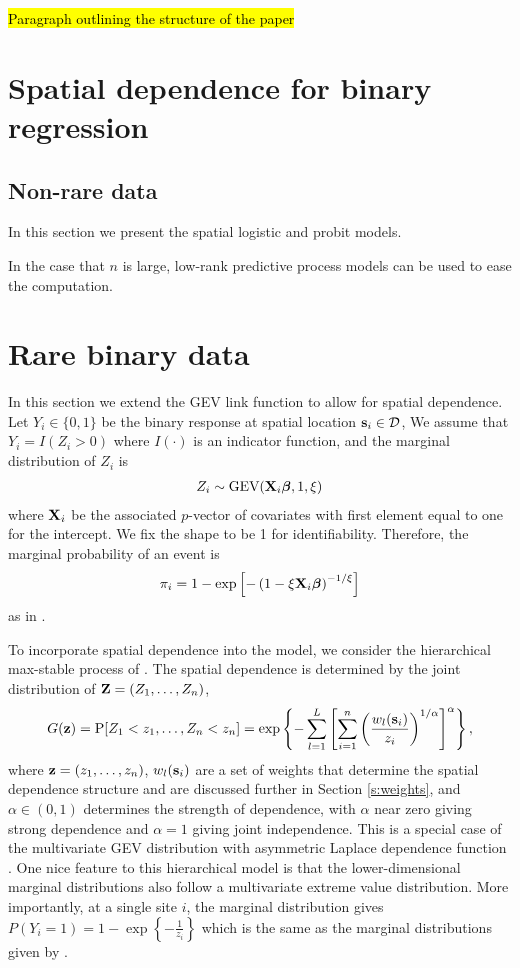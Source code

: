 \documentclass[11pt]{article}
\begin{document}
\hl{Paragraph outlining the structure of the paper}

\section{Spatial dependence for binary regression}
\subsection{Non-rare data}\label{s:nonrarebinary}
In this section we present the spatial logistic and probit models.

In the case that $n$ is large, low-rank predictive process models can be used to ease the computation.

\section{Rare binary data}\label{s:rarebinary}
In this section we extend the GEV link function to allow for spatial dependence.
Let $Y_i\in\{0,1\}$ be the binary response at spatial location $\mbox{\bf s}_i \in {\cal D}$,
We assume that $Y_i = I(Z_i > 0)$ where $I(\cdot)$ is an indicator function, and the marginal distribution of $Z_i$ is
\begin{align}
  Z_i \sim \text{GEV}(\mbox{\bf X}_i \mbox{\boldmath $\beta$}, 1, \xi)
\end{align}
where $\mbox{\bf X}_i$ be the associated $p$-vector of covariates with first element equal to one for the intercept.
We fix the shape to be 1 for identifiability.
Therefore, the marginal probability of an event is
\begin{align} \label{eq:marginalz}
  \pi_i= 1 - \exp \left[-\left(1 - \xi \mbox{\bf X}_i \mbox{\boldmath $\beta$} \right)^{-1 / \xi} \right]
\end{align}
as in \citet{Wang2010}.

To incorporate spatial dependence into the model, we consider the hierarchical max-stable process of \citet{Reich2012}.
The spatial dependence is determined by the joint distribution of $\mbox{\bf Z} = (Z_1,\ldots,Z_n)$,
\begin{align}\label{jointCDF}
 G(\mbox{\bf z}) =  \mbox{P}[Z_1<z_1,\ldots,Z_n<z_n] = \exp\left\{-\sum_{l=1}^L\left[\sum_{i=1}^n\left(\frac{w_{l}(\mbox{\bf s}_i)}{z_i}\right)^{1/\alpha}\right]^{\alpha}\right\},
\end{align}
where $\mbox{\bf z} = (z_1,\ldots,z_n)$, $w_{l}(\mbox{\bf s}_i)$ are a set of weights that determine the spatial dependence structure and are discussed further in Section \ref{s:weights}, and $\alpha\in(0,1)$ determines the strength of dependence, with $\alpha$ near zero giving strong dependence and $\alpha=1$ giving joint independence.
This is a special case of the multivariate GEV distribution with asymmetric Laplace dependence function \citep{Tawn1990}.
One nice feature to this hierarchical model is that the lower-dimensional marginal distributions also follow a multivariate extreme value distribution.
More importantly, at a single site $i$, the marginal distribution gives \mbox{$P(Y_i = 1) = 1 - \exp\left\{ -\frac{ 1 }{ z_i} \right\}$} which is the same as the marginal distributions given by \citet{Wang2010}.
\end{document}

